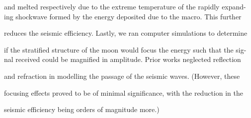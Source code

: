 and melted respectively due to the extreme temperature of the rapidly expand-
ing shockwave formed by the energy deposited due to the macro. This further

reduces the seismic efficiency. Lastly, we ran computer simulations to determine

if the stratified structure of the moon would focus the energy such that the sig-
nal received could be magnified in amplitude. Prior works neglected reflection

and refraction in modelling the passage of the seismic waves. (However, these

focusing effects proved to be of minimal significance, with the reduction in the

seismic efficiency being orders of magnitude more.)